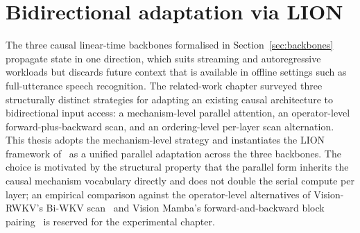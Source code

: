 \section{Bidirectional adaptation via LION}\label{sec:lion}

The three causal linear-time backbones formalised in
Section~\ref{sec:backbones} propagate state in one direction, which
suits streaming and autoregressive workloads but discards future
context that is available in offline settings such as full-utterance
speech recognition. The related-work chapter surveyed three
structurally distinct strategies for adapting an existing causal
architecture to bidirectional input access: a mechanism-level
parallel attention, an operator-level forward-plus-backward scan, and
an ordering-level per-layer scan alternation. This thesis adopts the
mechanism-level strategy and instantiates the LION framework
of~\citet{afzal2025linear} as a unified parallel adaptation across
the three backbones. The choice is motivated by the structural
property that the parallel form inherits the causal mechanism
vocabulary directly and does not double the serial compute per layer;
an empirical comparison against the operator-level alternatives of
Vision-RWKV's Bi-WKV scan~\cite{duan2024visionrwkv} and Vision
Mamba's forward-and-backward block pairing~\cite{zhu2024visionmamba}
is reserved for the experimental chapter.

